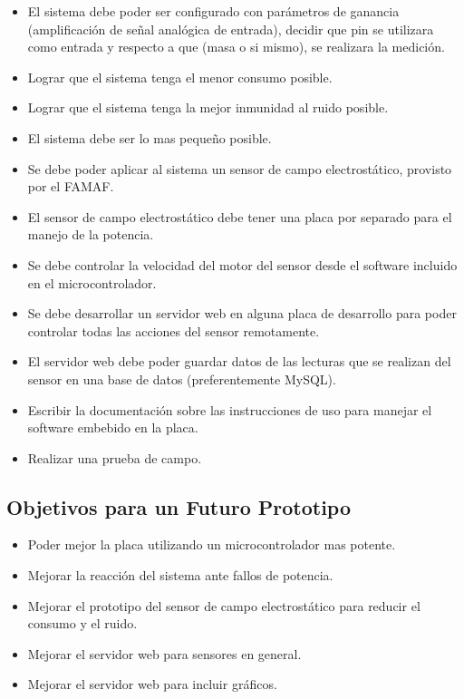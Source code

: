 \begin{itemize}
    \item El sistema debe poder ser configurado con parámetros de ganancia (amplificación de señal analógica de entrada), decidir que pin se utilizara como entrada y respecto a que (masa o si mismo), se realizara la medición.
    \item Lograr que el sistema tenga el menor consumo posible.
    \item Lograr que el sistema tenga la mejor inmunidad al ruido posible.
    \item El sistema debe ser lo mas pequeño posible.
    \item Se debe poder aplicar al sistema un sensor de campo electrostático, provisto por el FAMAF.
    \item El sensor de campo electrostático debe tener una placa por separado para el manejo de la potencia.
    \item Se debe controlar la velocidad del motor del sensor desde el software incluido en el microcontrolador.
    \item Se debe desarrollar un servidor web en alguna placa de desarrollo para poder controlar todas las acciones del sensor remotamente.
    \item El servidor web debe poder guardar datos de las lecturas que se realizan del sensor en una base de datos (preferentemente MySQL).
    \item Escribir la documentación sobre las instrucciones de uso para manejar el software embebido en la placa.
    \item Realizar una prueba de campo.
\end{itemize}


\subsection{Objetivos para un Futuro Prototipo} %
\label{sec: objetivos_futuros}

\begin{itemize}
    \item Poder mejor la placa utilizando un microcontrolador mas potente.
    \item Mejorar la reacción del sistema ante fallos de potencia.
    \item Mejorar el prototipo del sensor de campo electrostático para reducir el consumo y el ruido.
    \item Mejorar el servidor web para sensores en general.
    \item Mejorar el servidor web para incluir gráficos.
\end{itemize}

